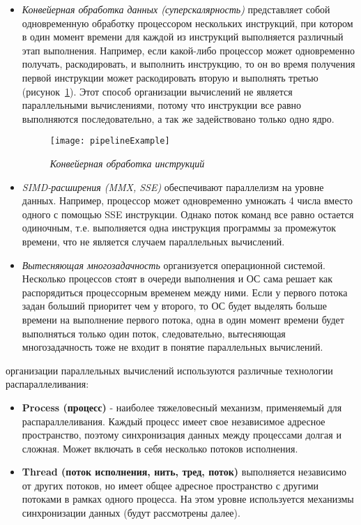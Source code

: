 {		\begin{itemize}
			\item\textit{Конвейерная обработка данных (суперскалярность)} представляет собой одновременную обработку процессором нескольких инструкций, при котором в один момент времени для каждой из инструкций выполняется различный этап выполнения. Например, если какой-либо процессор может одновременно получать, раскодировать, и выполнить инструкцию, то он во время получения первой инструкции может раскодировать вторую и выполнять третью (рисунок~\ref{pipelineExample:image}). Этот способ организации вычислений не является параллельными вычислениями, потому что инструкции все равно выполняются последовательно, а так же задействовано только одно ядро.
				\begin{figure}[H]
					\texttt{[image: pipelineExample]}
					\caption{\textit{Конвейерная обработка инструкций}}
					\label{pipelineExample:image}
				\end{figure}
			\item\textit{SIMD-расширения (MMX, SSE)} обеспечивают параллелизм на уровне данных. Например, процессор может одновременно умножать 4 числа вместо одного с помощью SSE инструкции. Однако поток команд все равно остается одиночным, т.е. выполняется одна инструкция программы за промежуток времени, что не является случаем параллельных вычислений.
			\item\textit{Вытесняющая многозадачность} организуется операционной системой. Несколько процессов стоят в очереди выполнения и ОС сама решает как распорядиться процессорным временем между ними. Если у первого потока задан больший приоритет чем у второго, то ОС будет выделять больше времени на выполнение первого потока, одна в один момент времени будет выполняться только один поток, следовательно, вытесняющая многозадачность тоже не входит в понятие параллельных вычислений.
		\end{itemize}
	 организации параллельных вычислений используются различные технологии распараллеливания:
		\begin{itemize}
			\item\textbf{Process (процесс)} - наиболее тяжеловесный механизм, применяемый для распараллеливания. Каждый процесс имеет свое независимое адресное пространство, поэтому синхронизация данных между процессами долгая и сложная. Может включать в себя несколько потоков исполнения.
			\item\textbf{Thread (поток исполнения, нить, тред, поток)} выполняется независимо от других потоков, но имеет общее адресное пространство с другими потоками в рамках одного процесса. На этом уровне используется механизмы синхронизации данных (будут рассмотрены далее).

\end{itemize}}
